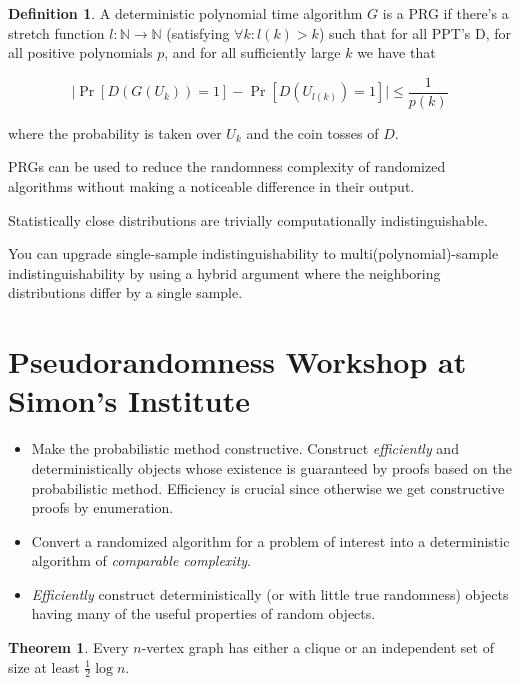 \documentclass{article}
\theoremstyle{definition}
\newtheorem{definition}{Definition}
\newtheorem{theorem}{Theorem}[section]
\newcommand{\N}{\mathbb{N}}
\begin{document}
\begin{definition}
    A deterministic polynomial time algorithm $G$ is a PRG if there's 
    a stretch function $l: \N \xrightarrow{} \N$ (satisfying $\forall k: l(k) > k$)
    such that for all PPT's D, for all positive polynomials $p$, and for all
    sufficiently large $k$ we have that 

    \[ \lvert \Pr[D(G(U_{k})) = 1] - \Pr[D(U_{l(k)}) = 1] \rvert \leq \frac{1}{p(k)}\]

    where the probability is taken over $U_{k}$ and the coin tosses of $D$.
\end{definition}

PRGs can be used to reduce the randomness complexity of randomized algorithms
without making a noticeable difference in their output.

Statistically close distributions are trivially computationally indistinguishable.

You can upgrade single-sample indistinguishability to multi(polynomial)-sample indistinguishability
by using a hybrid argument where the neighboring distributions differ by a single sample.

\newpage

\section{Pseudorandomness Workshop at Simon's Institute}

\begin{itemize}
    \item Make the probabilistic method constructive. Construct \textit{efficiently} and
    deterministically objects whose existence is guaranteed by proofs based on the probabilistic
    method. Efficiency is crucial since otherwise we get constructive proofs by enumeration.
    \item Convert a randomized algorithm for a problem of interest into a deterministic algorithm
    of \textit{comparable complexity}.
    \item \textit{Efficiently} construct deterministically (or with little true randomness)
    objects having many of the useful properties of random objects.
\end{itemize}

\begin{theorem}
    Every $n$-vertex graph has either a clique or an independent set of size
    at least $\frac{1}{2} \log n$.
\end{theorem}
\end{document}

